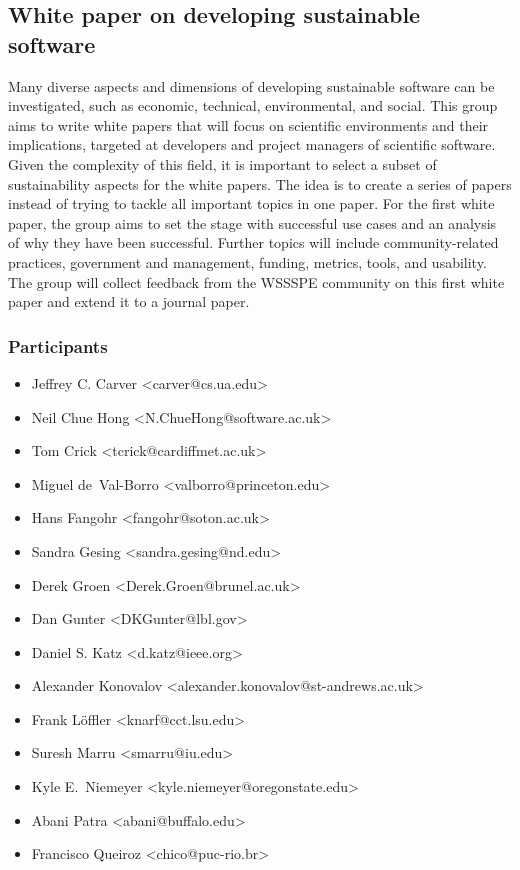 \subsection{White paper on developing sustainable software}
\label{sec:best-practices-developing}



Many diverse aspects and dimensions of developing sustainable software can be investigated,
such as economic, technical, environmental, and social. This group aims to write white papers
that will focus on scientific environments and their implications, targeted at developers
and project managers of scientific software. Given the complexity of this field, it is important to select
a subset of sustainability aspects for the white papers. The idea is to create a series of papers instead of trying
to tackle all important topics in one paper. For the first white paper, the group aims to set the
stage with successful use cases and an analysis of why they have been successful.
Further topics will include community-related practices, government and management, funding,
metrics, tools, and usability. The group will collect feedback from the WSSSPE
community on this first white paper and extend it to a journal paper.

\subsubsection{Participants}

\begin{itemize}
\item Jeffrey C. Carver <carver@cs.ua.edu>
\item Neil Chue Hong <N.ChueHong@software.ac.uk>
\item Tom Crick <tcrick@cardiffmet.ac.uk>
\item Miguel de~Val-Borro <valborro@princeton.edu>
\item Hans Fangohr <fangohr@soton.ac.uk>
\item Sandra Gesing <sandra.gesing@nd.edu>
\item Derek Groen <Derek.Groen@brunel.ac.uk>
\item Dan Gunter <DKGunter@lbl.gov>
\item Daniel S. Katz <d.katz@ieee.org>
\item Alexander Konovalov <alexander.konovalov@st-andrews.ac.uk>
\item Frank L\"offler <knarf@cct.lsu.edu>
\item Suresh Marru <smarru@iu.edu>
\item Kyle E.~Niemeyer <kyle.niemeyer@oregonstate.edu>
\item Abani Patra <abani@buffalo.edu>
\item Francisco Queiroz <chico@puc-rio.br>
\end{itemize}

